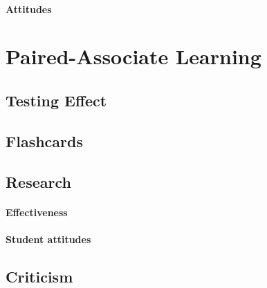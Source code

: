             \paragraph{Attitudes}

    \section{Paired-Associate Learning}

        \subsection{Testing Effect}

        \subsection{Flashcards}

        \subsection{Research}

            \paragraph{Effectiveness}

            \paragraph{Student attitudes}

        \subsection{Criticism}
